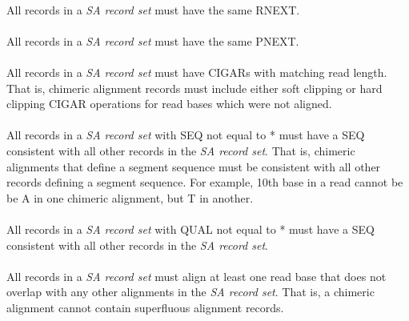 \documentclass[10pt]{article}
\begin{document}
\paragraph{}

All records in a \textit{SA record set} must have the same RNEXT.

\paragraph{}

All records in a \textit{SA record set} must have the same PNEXT.

\paragraph{}

All records in a \textit{SA record set} must have CIGARs with matching read length. That is,
chimeric alignment records must include either soft clipping or hard clipping CIGAR operations
for read bases which were not aligned.

\paragraph{}

All records in a \textit{SA record set} with SEQ not equal to * must have a SEQ consistent
with all other records in the \textit{SA record set}. That is, chimeric alignments that define
a segment sequence must be consistent with all other records defining a segment sequence. For
example, 10th base in a read cannot be be A in one chimeric alignment, but T in another.

\paragraph{}

All records in a \textit{SA record set} with QUAL not equal to * must have a SEQ consistent
with all other records in the \textit{SA record set}.

\paragraph{}

All records in a \textit{SA record set} must align at least one read base that does not
overlap with any other alignments in the \textit{SA record set}.
That is, a chimeric alignment cannot contain superfluous alignment records.
\end{document}
